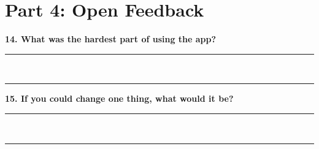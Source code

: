 \section*{Part 4: Open Feedback}

\vspace{1em}

\noindent \textbf{14. What was the hardest part of using the app?} \\[2em]
\rule{\textwidth}{0.4pt} \\[1cm]
\rule{\textwidth}{0.4pt}

\vspace{1cm}

\noindent \textbf{15. If you could change one thing, what would it be?} \\[2em]
\rule{\textwidth}{0.4pt} \\[1cm]
\rule{\textwidth}{0.4pt}
